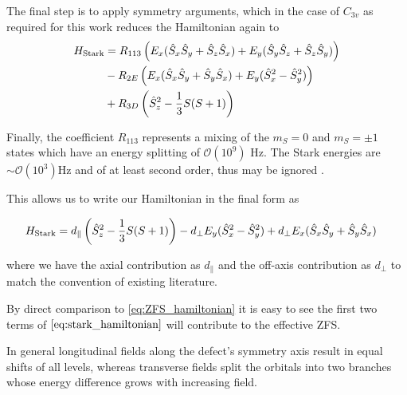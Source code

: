 The final step is to apply symmetry arguments, which in the case of $C_{3v}$ as required for this work reduces the Hamiltonian again to 
\begin{equation}
    \begin{align}
        H_{\ce{Stark}} &= R_{113}\left(E_x (\hat{S}_x\hat{S}_y + \hat{S}_z\hat{S}_x) + E_y(\hat{S}_y\hat{S}_z + \hat{S}_z\hat{S}_y) \right) \\ 
                       &- R_{2E} \left(E_x(\hat{S}_x\hat{S}_y + \hat{S}_y\hat{S}_x) + E_y(\hat{S}_x^2 - \hat{S}_y^2   )\right) \\ 
                       &+ R_{3D}\left(\hat{S}_z^2 - \frac{1}{3} S(S+1)\right)
    \end{align}
    \label{eq:}
\end{equation}


Finally, the coefficient $R_{113}$ represents a mixing of the $m_S = 0$ and $m_S = \pm 1$ states which have an energy splitting of $\mathcal{O}(10^9)$ Hz. The Stark energies are $\sim \mathcal{O} (10^3)$Hz and of at least second order, thus may be ignored \cite{VanOort1990}.  

This allows us to write our Hamiltonian in the final form as 

\begin{equation}
    \begin{align}
        H_{\ce{Stark}} &=
                        d_\parallel\left(\hat{S}_z^2 - \frac{1}{3} S(S+1)\right)
        - d_\perp  E_y(\hat{S}_x^2 - \hat{S}_y^2   ) + d_\perp E_x(\hat{S}_x\hat{S}_y + \hat{S}_y\hat{S}_x)  
    \end{align}
    \label{eq:stark_hamiltonian}
\end{equation}

where we have the axial contribution as $d_\parallel$ and the off-axis contribution as $d_\perp$ to match the convention of existing literature. 

By direct comparison to \ref{eq:ZFS_hamiltonian} it is easy to see the first two terms of $\ref{eq:stark_hamiltonian}$ will contribute to the effective ZFS.  

In general longitudinal fields along the defect’s symmetry axis result in equal shifts of all levels, whereas transverse fields split the orbitals into two branches whose energy difference grows with increasing field. 


